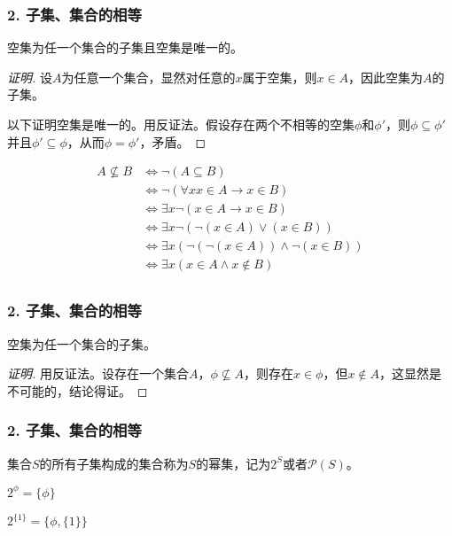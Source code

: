 \documentclass{beamer}
\begin{document}
\begin{CJK*}{UTF8}{gbsn}
\begin{frame}
\end{frame}
\begin{frame}
  \frametitle{2. 子集、集合的相等}
  \begin{Thm}
   空集为任一个集合的子集且空集是唯一的。 
 \end{Thm}
 \pause
 \begin{proof}[证明]
\pause
   设$A$为任意一个集合，显然对任意的$x$属于空集，则$x\in A$，因此空集为$A$的子集。
   \pause
   
以下证明空集是唯一的。用反证法。假设存在两个不相等的空集$\phi$和$\phi'$，则$\phi \subseteq \phi'$并且$\phi' \subseteq \phi$，从而$\phi = \phi'$，矛盾。  
 \end{proof}
\end{frame}
\begin{frame}
  \begin{equation*}
    \begin{split}
      A\nsubseteq B &\Leftrightarrow \lnot(A \subseteq B)\\
      &\Leftrightarrow \lnot( \forall x x \in A \to x \in B)\\
      &\Leftrightarrow \exists x \lnot(x \in A \to x \in B)\\
      &\Leftrightarrow \exists x \lnot( \lnot (x \in A) \lor (x \in B))\\
      &\Leftrightarrow \exists x (\lnot( \lnot (x \in A)) \land \lnot ( x \in B))\\
      &\Leftrightarrow \exists x (x \in A \land x \notin B)\\
    \end{split}
  \end{equation*}
  
\end{frame}
\begin{frame}
  \frametitle{2. 子集、集合的相等}
   空集为任一个集合的子集。 
 \pause
 \begin{proof}[证明]
\pause
   用反证法。设存在一个集合$A$，$\phi \nsubseteq A$，则存在$x\in \phi$，但$x \notin A$，这显然是不可能的，结论得证。   
 \end{proof}  
\end{frame}
\begin{frame}
  \frametitle{2. 子集、集合的相等}
\begin{Def}
  集合$S$的所有子集构成的集合称为$S$的幂集，记为$2^S$或者$\mathcal{P}(S)$。
\end{Def}\pause
\begin{Ex}
    $2^{\phi}=\{\phi\}$

    $2^{\{1\}}=\{\phi, \{1\}\}$


\end{Ex}
\end{frame}
\end{CJK*}
\end{document}
